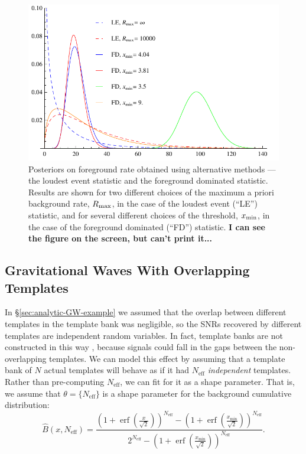 \documentclass[aps,prd]{revtex4-1}
\newcommand{\xmin}{x_\mathrm{min}}
\newcommand{\ilya}[1]{{\color{red} \bf #1}}
\DeclareMathOperator{\erf}{erf}
\begin{document}
\begin{figure}
  \includegraphics[width=\columnwidth]{AltMethodComp}
  \caption{\label{fig:altmeth}Posteriors on foreground rate obtained
    using alternative methods --- the loudest event statistic and the
    foreground dominated statistic. Results are shown for two
    different choices of the maximum a priori background rate, $R_{\rm
      max}$, in the case of the loudest event (``LE'') statistic, and
    for several different choices of the threshold, $x_{\rm min}$, in
    the case of the foreground dominated (``FD'') statistic. \ilya{I
      can see the figure on the screen, but can't print it...}}
\end{figure}

\subsection{Gravitational Waves With Overlapping Templates}
\label{sec:gw-overlapping-template}

In \S \ref{sec:analytic-GW-example} we assumed that the overlap
between different templates in the template bank was negligible, so
the SNRs recovered by different templates are independent random
variables.  In fact, template banks are not constructed in this way
\citep[e.g.,][]{Owen:1998dk,Ajith:2008},
because signals could fall in the gaps between the non-overlapping
templates.  We can model this effect by assuming that a template bank
of $N$ actual templates will behave as if it had $N_\mathrm{eff}$
\emph{independent} templates.  Rather than pre-computing
$N_\mathrm{eff}$, we can fit for it as a shape parameter.  That is, we
assume that $\theta = \{N_\mathrm{eff}\}$ is a shape parameter for the
background cumulative distribution:
\begin{equation}
  \hat{B}\left(x, N_\mathrm{eff}\right) = \frac{\left( 1 + \erf\left(
    \frac{x}{\sqrt{2}} \right) \right)^{N_\mathrm{eff}} - \left( 1 +
    \erf\left( \frac{\xmin}{\sqrt{2}} \right)
    \right)^{N_\mathrm{eff}}}{2^{N_\mathrm{eff}} - \left( 1 +
    \erf\left( \frac{\xmin}{\sqrt{2}} \right) \right)^{N_\mathrm{eff}}
  }.
\end{equation}
\end{document}
